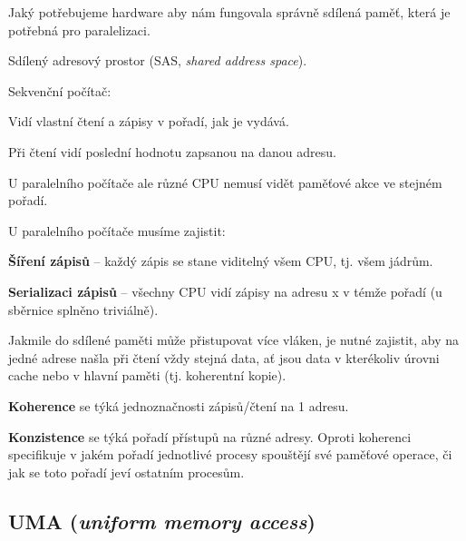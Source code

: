 \begin{compactitem}
    \item Jaký potřebujeme hardware aby nám fungovala správně sdílená paměť, která je potřebná pro paralelizaci.

    \item Sdílený adresový prostor (SAS, \textit{shared address space}).

    \item Sekvenční počítač: \begin{compactitem}
        \item Vidí vlastní čtení a zápisy v pořadí, jak je vydává.
        \item Při čtení vidí poslední hodnotu zapsanou na danou adresu.
        \item U paralelního počítače ale různé CPU nemusí vidět paměťové akce ve stejném pořadí.
    \end{compactitem}

    \item U paralelního počítače musíme zajistit: \begin{compactitem}
        \item \textbf{Šíření zápisů} -- každý zápis se stane viditelný všem CPU, tj. všem jádrům.
        \item \textbf{Serializaci zápisů} -- všechny CPU vidí zápisy na adresu x v témže pořadí (u sběrnice splněno triviálně).
    \end{compactitem}

    \item Jakmile do sdílené paměti může přistupovat více vláken, je nutné zajistit, aby na jedné adrese našla při čtení vždy stejná data, ať jsou data v kterékoliv úrovni cache nebo v hlavní paměti (tj. koherentní kopie).

    \item \textbf{Koherence} se týká jednoznačnosti zápisů/čtení na 1 adresu.

    \item \textbf{Konzistence} se týká pořadí přístupů na různé adresy. Oproti koherenci specifikuje v jakém pořadí jednotlivé procesy spouštějí své paměťové operace, či jak se toto pořadí jeví ostatním procesům.
\end{compactitem}

\subsection{UMA (\textit{uniform memory access})}

